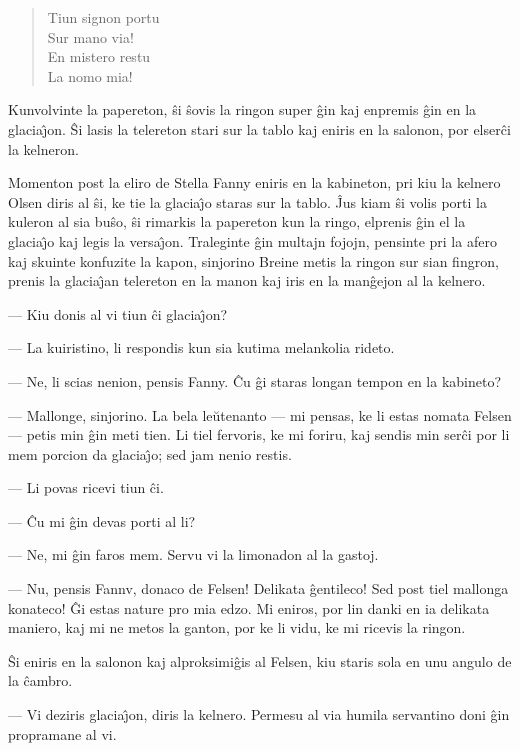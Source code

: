 \begin{quote}
\footnotesize Tiun signon portu\\
 Sur mano via!\\
 En mistero restu\\
 La nomo mia!
\end{quote}

   Kunvolvinte la papereton, \^si \^sovis la ringon super \^gin kaj
enpremis \^gin en la glacia\^{\j}on. \^Si lasis la telereton stari
sur la tablo kaj eniris en la salonon, por elser\^ci la kelneron.

   Momenton post la eliro de Stella Fanny eniris en la kabineton, pri
kiu la kelnero Olsen diris al \^si, ke tie la glacia\^{\j}o staras
sur la tablo. \^Jus kiam \^si volis porti la kuleron al sia bu\^so,
\^si rimarkis la papereton kun la ringo, elprenis \^gin el la
glacia\^{\j}o kaj legis la versa\^{\j}on. Traleginte \^gin multajn
fojojn, pensinte pri la afero kaj skuinte konfuzite la kapon,
sinjorino Breine metis la ringon sur sian fingron, prenis la
glacia\^{\j}an telereton en la manon kaj iris en la man\^gejon al la
kelnero.

 --- Kiu donis al vi tiun \^ci glacia\^{\j}on?

 --- La kuiristino, li respondis kun sia kutima melankolia rideto.

 --- Ne, li scias nenion, pensis Fanny. \^Cu \^gi staras longan tempon en
la kabineto?

 --- Mallonge, sinjorino. La bela le\u utenanto --- mi pensas, ke li estas
nomata Felsen --- petis min \^gin meti tien. Li tiel fervoris, ke mi
foriru, kaj sendis min ser\^ci por li mem porcion da glacia\^{\j}o;
sed jam nenio restis.

 --- Li povas ricevi tiun \^ci.

 --- \^Cu mi \^gin devas porti al li?

 --- Ne, mi \^gin faros mem. Servu vi la limonadon al la gastoj.

 --- Nu, pensis Fannv, donaco de Felsen! Delikata \^gentileco! Sed post
tiel mallonga konateco! \^Gi estas nature pro mia edzo. Mi eniros,
por lin danki en ia delikata maniero, kaj mi ne metos la ganton, por
ke li vidu, ke mi ricevis la ringon.

   \^Si eniris en la salonon kaj alproksimi\^gis al Felsen, kiu staris
sola en unu angulo de la \^cambro.

 --- Vi deziris glacia\^{\j}on, diris la kelnero. Permesu al via humila
servantino doni \^gin propramane al vi.

